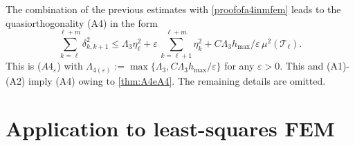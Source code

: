 \documentclass{siamltex1213}
\begin{document}
The combination of the previous estimates with \eqref{proofofa4inmfem} leads to the quasiorthogonality
(A4) in the form
\[
\sum_{k=\ell}^{\ell+m} \delta_{k,k+1}^2
\le {\ensuremath{\Lambda_{\mathrm{3}}}}\eta_\ell^2+ \varepsilon \, \sum_{k=\ell+1}^{\ell+m}\eta_k^2
+C {\ensuremath{\Lambda_{\mathrm{3}}}} h_{\max}/\varepsilon \, \mu^2({\mathcal{T}}_\ell).
\]
This is ($A4_\varepsilon$) with ${\ensuremath{\Lambda_{\mathrm{4}(\varepsilon)}}}:=\max\{ {\ensuremath{\Lambda_{\mathrm{3}}}}, C {\ensuremath{\Lambda_{\mathrm{3}}}} h_{\max}/\varepsilon\}$ 
for any $\varepsilon>0$. This and (A1)-(A2) imply (A4) owing to \cref{thm:A4eA4}.
The remaining details are omitted. 
\qquad \endproof

\section{Application to least-squares FEM}
\label{s:appllsfem}
\end{document}
